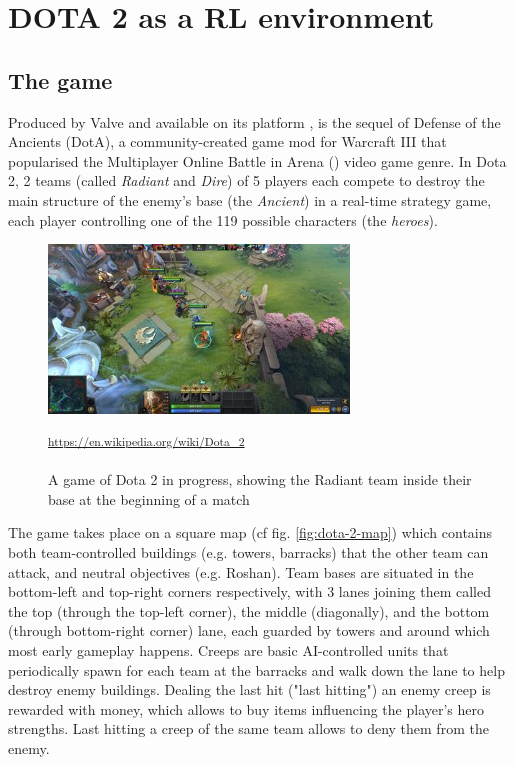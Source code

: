 \section{DOTA 2 as a RL environment}
\subsection{The game}

Produced by Valve and available on its platform ,  is the sequel of Defense of the Ancients (DotA), a community-created game mod for Warcraft III that popularised the Multiplayer Online Battle in Arena () video game genre. In Dota 2, 2 teams (called \textit{Radiant} and \textit{Dire}) of 5 players each compete to destroy the main structure of the enemy's base (the \textit{Ancient}) in a real-time strategy game, each player controlling one of the 119 possible characters (the \textit{heroes}).

\begin{figure}[H]
 \centering
 \captionsetup{justification=centering, margin=0.5cm}
 \includegraphics[width=8cm]{images/Dota_2_Gameplay_Aug_2017.jpg}
\caption{A game of Dota 2 in progress, showing the Radiant team inside their base at the beginning of a match}
 \small\textsuperscript{\url{https://en.wikipedia.org/wiki/Dota_2}}
 \label{fig:dota-2-game}
\end{figure}

The game takes place on a square map (cf fig. \ref{fig:dota-2-map}) which contains both team-controlled buildings (e.g. towers, barracks) that the other team can attack, and neutral objectives (e.g. Roshan). Team bases are situated in the bottom-left and top-right corners respectively, with 3 lanes joining them called the top (through the top-left corner), the middle (diagonally), and the bottom (through bottom-right corner) lane, each guarded by towers and around which most early gameplay happens. Creeps are basic AI-controlled units that periodically spawn for each team at the barracks and walk down the lane to help destroy enemy buildings. Dealing the last hit ("last hitting") an enemy creep is rewarded with money, which allows to buy items influencing the player's hero strengths. Last hitting a creep of the same team allows to deny them from the enemy. 

